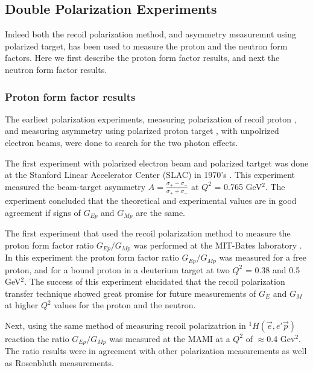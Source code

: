 
\subsection{Double Polarization Experiments}
\label{subsec:poltransfer}



Indeed both the recoil polarization method, and asymmetry measuremnt using polarized target, has been used to measure 
the proton and the neutron form factors. Here we first describe the proton form factor results,  
and next the neutron form factor results. 

\subsubsection{Proton form factor results}

The earliest polarization experiments, measuring polarization of recoil proton \cite{bizot}, and
measuring asymmetry using polarized proton target \cite{powell}, with unpolrized electron beams,
were done to search for the two photon effects.  

The first experiment with polarized electron beam and polarized tartget was done at the Stanford 
Linear Accelerator Center (SLAC) in 1970's \cite{alguard}. 
This experiment measured the beam-target asymmetry $A=\frac{\sigma_{+} -\sigma_{-}}{\sigma_{+} + \sigma_{-}}$
at $Q^2$ = 0.765 GeV$^2$. The experiment concluded that the theoretical and experimental values are in 
good agreement if signs of $G_{Ep}$ and $G_{Mp}$ are the same. 

The first experiment that used the recoil polarization method to measure the proton form factor ratio $G_{Ep}/G_{Mp}$ 
was performed at the MIT-Bates laboratory \cite{milbrathA,barkhuff}. In this experiment the proton 
form factor ratio $G_{Ep}/G_{Mp}$ was measured for a free proton, and for a bound proton in a deuterium 
target at two $Q^2$ = 0.38 and 0.5 GeV$^2$. The success of this experiment elucidated that 
the recoil polarization transfer technique showed great promise for future measurements of $G_{E}$ and 
$G_{M}$ at higher $Q^2$ values for the proton and the neutron. 

Next, using the same method of measuring recoil polarizatrion in $^1H(\vec e,e' \vec p)$ reaction 
the ratio $G_{Ep}/G_{Mp}$  was measured at the MAMI  \cite{pospischil,dietrich} at 
a $Q^2$ of $\approx$0.4 Gev$^2$. The ratio results were in agreement with other polarization 
measurements as well as Rosenbluth measurements. 

